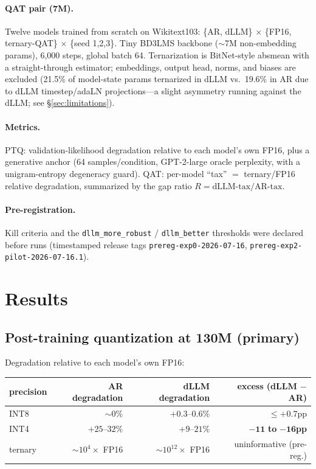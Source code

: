 \documentclass[11pt]{article}
\begin{document}
\paragraph{QAT pair (7M).} Twelve models trained from scratch on Wikitext103: \{AR, dLLM\} $\times$ \{FP16, ternary-QAT\} $\times$ \{seed 1,2,3\}. Tiny BD3LMS backbone ($\sim$7M non-embedding params), 6{,}000 steps, global batch 64. Ternarization is BitNet-style absmean with a straight-through estimator; embeddings, output head, norms, and biases are excluded (21.5\% of model-state params ternarized in dLLM vs.\ 19.6\% in AR due to dLLM timestep/adaLN projections---a slight asymmetry running against the dLLM; see \S\ref{sec:limitations}).

\paragraph{Metrics.} PTQ: validation-likelihood degradation relative to each model's own FP16, plus a generative anchor (64 samples/condition, GPT-2-large oracle perplexity, with a unigram-entropy degeneracy guard). QAT: per-model ``tax'' $=$ ternary/FP16 relative degradation, summarized by the gap ratio $R = \text{dLLM-tax} / \text{AR-tax}$.

\paragraph{Pre-registration.} Kill criteria and the \texttt{dllm\_more\_robust} / \texttt{dllm\_better} thresholds were declared before runs (timestamped release tags \texttt{prereg-exp0-2026-07-16}, \texttt{prereg-exp2-pilot-2026-07-16.1}).

\section{Results}

\subsection{Post-training quantization at 130M (primary)}
\label{sec:ptq}

Degradation relative to each model's own FP16:

\begin{center}
\begin{tabular}{lrrr}
\toprule
precision & AR degradation & dLLM degradation & excess (dLLM $-$ AR) \\
\midrule
INT8 & $\sim$0\% & $+0.3$--$0.6\%$ & $\le +0.7$pp \\
INT4 & $+25$--$32\%$ & $+9$--$21\%$ & $\mathbf{-11}$ \textbf{to} $\mathbf{-16}$\textbf{pp} \\
ternary & $\sim$$10^4\times$ FP16 & $\sim$$10^{12}\times$ FP16 & uninformative (pre-reg.) \\
\bottomrule
\end{tabular}
\end{center}
\end{document}
